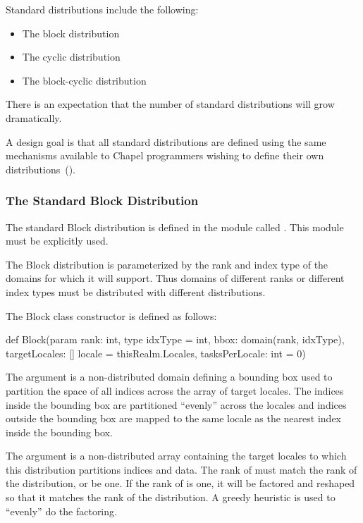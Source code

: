 \label{Standard_Distributions}

Standard distributions include the following:
\begin{itemize}
\item The block distribution 
\item The cyclic distribution 
\item The block-cyclic distribution 
\end{itemize}

\begin{openissue}
There is an expectation that the number of standard distributions will
grow dramatically.
\end{openissue}

A design goal is that all standard distributions are defined using the
same mechanisms available to Chapel programmers wishing to define
their own distributions~().

\subsubsection{The Standard Block Distribution}
\label{Block_Dist}

The standard Block distribution is defined in the module
called .  This module must be explicitly used.

The Block distribution is parameterized by the rank and index type of
the domains for which it will support.  Thus domains of different
ranks or different index types must be distributed with different
distributions.

The Block class constructor is defined as follows:
\begin{chapel}
def Block(param rank: int,
          type idxType = int,
          bbox: domain(rank, idxType),
          targetLocales: [] locale = thisRealm.Locales, 
          tasksPerLocale: int = 0)
\end{chapel}

The argument  is a non-distributed domain defining a
bounding box used to partition the space of all indices across the
array of target locales.  The indices inside the bounding box are
partitioned ``evenly'' across the locales and indices outside the
bounding box are mapped to the same locale as the nearest index inside
the bounding box.

The argument  is a non-distributed array
containing the target locales to which this distribution partitions
indices and data.  The rank of  must match the
rank of the distribution, or be one.  If the rank
of  is one, it will be factored and reshaped so
that it matches the rank of the distribution.  A greedy heuristic is
used to ``evenly'' do the factoring.

